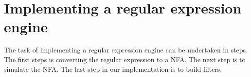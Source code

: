 \section{Implementing a regular expression engine}
\label{sec:implementation}
The task of implementing a regular expression engine can be undertaken
in steps. The first steps is converting the regular expression to a
NFA. The next step is to simulate the NFA. The last step in our
implementation is to build filters.






